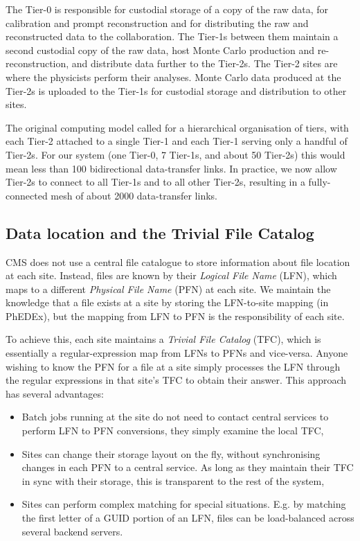 The Tier-0 is responsible for custodial storage of a copy of the raw data, for calibration and prompt 
reconstruction and for distributing the raw and reconstructed data to the collaboration. The 
Tier-1s between them maintain a second custodial copy of the raw data, host Monte Carlo production and
re-reconstruction, and distribute data further to the Tier-2s.
The Tier-2 sites are where the physicists perform their analyses. Monte Carlo data 
produced at the Tier-2s is uploaded to the Tier-1s for custodial storage and distribution to other sites.

The original computing model \cite{CTDR} called for a hierarchical organisation of tiers, with each Tier-2 
attached to a single Tier-1 and each Tier-1 serving only a handful of Tier-2s. For our system (one 
Tier-0, 7 Tier-1s, and about 50 Tier-2s) this would mean less than 100 bidirectional data-transfer links. In 
practice, we now allow Tier-2s to connect to all Tier-1s and to all other Tier-2s, resulting in a 
fully-connected mesh of about 2000 data-transfer links.

\subsection{Data location and the Trivial File Catalog}
CMS does not use a central file catalogue to store information about file location at each site. 
Instead, files are known by their {\it Logical File Name} (LFN), which maps to a different {\it 
Physical File Name} (PFN) at each site. We maintain the knowledge that a file exists at a site by 
storing the LFN-to-site mapping (in PhEDEx), but the mapping from LFN to PFN is the responsibility 
of each site.

To achieve this, each site maintains a {\it Trivial File Catalog} (TFC), which is essentially a 
regular-expression map from LFNs to PFNs and vice-versa. Anyone wishing to know the PFN for a file 
at a site simply processes the LFN through the regular expressions in that site's TFC to obtain 
their answer. This approach has several advantages:

\begin{itemize}
  \item Batch jobs running at the site do not need to contact central services to perform LFN to 
PFN conversions, they simply examine the local TFC,
  \item Sites can change their storage layout on the fly, without synchronising changes in each PFN
to a central service. As long as they maintain their TFC in sync with their storage, this is 
transparent to the rest of the system,
  \item Sites can perform complex matching for special situations. E.g. by matching the first 
letter of a GUID portion of an LFN, files can be load-balanced across several backend servers.
\end{itemize}
